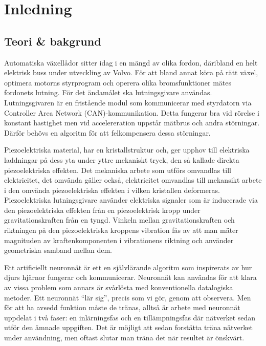 \section{Inledning}
\subsection{Teori \& bakgrund}

Automatiska växellådor sitter idag i en mängd av olika fordon,
däribland en helt elektrisk buss under utveckling av Volvo.
För att bland annat köra på rätt växel, optimera motorns styrprogram
och operera olika bromsfunktioner %
mätes fordonets lutning.
För det ändamålet ska lutningsgivare användas.
Lutningsgivaren är en fristående modul som kommunicerar med styrdatorn via
Controller Area Network (CAN)-kommunikation.
Detta fungerar bra vid rörelse i konstant hastighet
men vid accelereration uppstår mätbrus och andra störningar.
Därför behövs en algoritm för att felkompensera dessa störningar.


Piezoelektriska material, har en kristallstruktur och, ger upphov till
elektriska laddningar på dess yta under yttre mekaniskt tryck, den så kallade
direkta piezoelektriska effekten.
Det mekaniska arbete som utförs omvandlas till elektricitet, det omvända gäller
också, elektricitet omvandlas till mekansikt arbete i den omvända
piezoelektriska effekten i vilken kristallen deformeras.
\autocite{electronicdesign2016}
Piezoelektriska lutningsgivare använder elektriska signaler som är
inducerade via den piezoelektriska effekten från en piezoelektrisk kropp
under gravitationskraften från en tyngd.
Vinkeln mellan gravitationskraften och
riktningen på den piezoelektriska kroppens vibration
fås av att man mäter magnituden av kraftenkomponenten i vibrationens riktning
och använder geometriska samband mellan dem.
\autocite{chiang00}

Ett artificiellt neuronnät är ett en självlärande algoritm som inspirerats av
hur djurs hjärnor fungerar och kommunicerar.
Neuronnät kan användas för att klara av vissa problem som annars är svårlösta
med konventionella datalogiska metoder.
Ett neuronnät ``lär sig'', precis som vi gör, genom att observera.
Men för att ha avsedd funktion måste de tränas, alltså är arbete med neuronnät
uppdelat i två faser: en inlärningsfas och en tillämpningsfas där nätverket sedan
utför den ämnade uppgiften.
\autocite{copeland16}
Det är möjligt att sedan forstätta träna nätverket
under användning, men oftast slutar man träna det när resultet är önskvärt.
\autocite{wiki-neuronnat}

